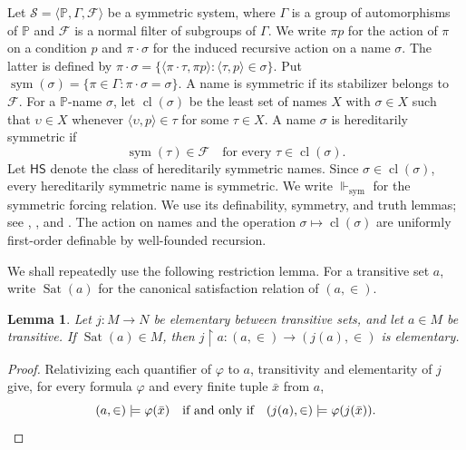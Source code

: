 \documentclass[11pt,a4paper]{amsart}
\newcommand{\HS}{\mathsf{HS}}
\newcommand{\sym}{\operatorname{sym}}
\newcommand{\forcesS}{\Vdash_{\mathrm{sym}}}
\newcommand{\restr}{\mathbin{\upharpoonright}}
\theoremstyle{plain}
\newtheorem{lemma}[theorem]{Lemma}
\theoremstyle{definition}
\theoremstyle{remark}
\begin{document}
Let $\mathscr S=\langle\mathbb P,\Gamma,\mathcal F\rangle$ be a symmetric system, where $\Gamma$ is a group of automorphisms of $\mathbb P$ and $\mathcal F$ is a normal filter of subgroups of $\Gamma$.  We write $\pi p$ for the action of $\pi$ on a condition $p$ and $\pi\cdot\sigma$ for the induced recursive action on a name $\sigma$.  The latter is defined by
$\pi\cdot\sigma=\{\langle\pi\cdot\tau,\pi p\rangle:\langle\tau,p\rangle\in\sigma\}$.  Put $\sym(\sigma)=\{\pi\in\Gamma:\pi\cdot\sigma=\sigma\}$.  A name is symmetric if its stabilizer belongs to $\mathcal F$.  For a $\mathbb P$-name $\sigma$, let $\operatorname{cl}(\sigma)$ be the least set of names $X$ with $\sigma\in X$ such that $\upsilon\in X$ whenever $\langle\upsilon,p\rangle\in\tau$ for some $\tau\in X$.  A name $\sigma$ is hereditarily symmetric if
\begin{equation}\label{eq:HS-characterization}
\sym(\tau)\in\mathcal F\quad\text{for every }\tau\in\operatorname{cl}(\sigma).
\end{equation}
Let $\HS$ denote the class of hereditarily symmetric names.  Since $\sigma\in\operatorname{cl}(\sigma)$, every hereditarily symmetric name is symmetric.  We write $\forcesS$ for the symmetric forcing relation.  We use its definability, symmetry, and truth lemmas; see \cite[Chapter~5]{Jech}, \cite[Section~2]{Karagila}, and {\cite[Lemma~2.2 and Theorem~2.5]{HayutKaragilaSmall}}.  The action on names and the operation $\sigma\mapsto\operatorname{cl}(\sigma)$ are uniformly first-order definable by well-founded recursion.

We shall repeatedly use the following restriction lemma.  For a transitive set $a$, write $\operatorname{Sat}(a)$ for the canonical satisfaction relation of $(a,\in)$.

\begin{lemma}\label{lem:restriction-elementarity}
Let $j:M\to N$ be elementary between transitive sets, and let $a\in M$ be transitive.  If $\operatorname{Sat}(a)\in M$, then $j\restr a:(a,\in)\longrightarrow(j(a),\in)$ is elementary.
\end{lemma}

\begin{proof}
{\color{auditgreen}Relativizing each quantifier of $\varphi$ to $a$, transitivity and elementarity of $j$ give, for every formula $\varphi$ and every finite tuple $\bar x$ from $a$,}
\[
(a,\in)\models\varphi(\bar x)
\quad\text{if and only if}\quad
(j(a),\in)\models\varphi(j(\bar x)).\qedhere
\]
\end{proof}
\end{document}
